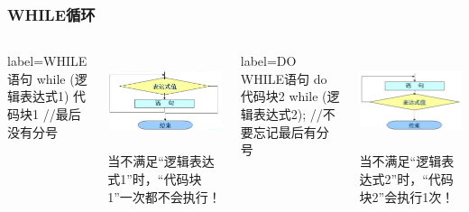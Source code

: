 \begin{frame}[fragile]
  \frametitle{WHILE循环}
  \begin{columns}
        \begin{javacode*}{label=WHILE语句}
          while (逻辑表达式1) {
            代码块1
          }
          //最后没有分号
        \end{javacode*}
        \includegraphics[width=\textwidth, height=80pt]{figures/while}
        当不满足“逻辑表达式1”时，“代码块1”一次都不会执行！
        \begin{javacode*}{label=DO WHILE语句}
          do {
            代码块2
          } while (逻辑表达式2); 
          //不要忘记最后有分号
        \end{javacode*}
        \includegraphics[width=\textwidth, height=80pt]{figures/do_while}
        当不满足“逻辑表达式2”时，“代码块2”会执行1次！
  \end{columns}
    
\end{frame}

